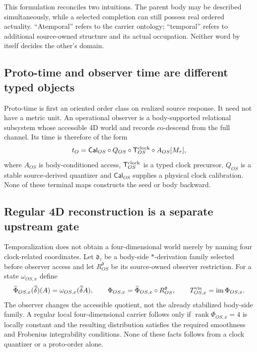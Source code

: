\documentclass[11pt]{article}
\begin{document}
This formulation reconciles two intuitions.  The parent body may be described
simultaneously, while a selected completion can still possess real ordered
actuality.  ``Atemporal'' refers to the carrier ontology; ``temporal'' refers
to additional source-owned structure and its actual occupation.  Neither word
by itself decides the other's domain.

\subsection{Proto-time and observer time are different typed objects}

Proto-time is first an oriented order class on realized source response.  It
need not have a metric unit.  An operational observer is a body-supported
relational subsystem whose accessible 4D world and records co-descend from
the full channel.  Its time is therefore of the form
\begin{equation}
 t_O
 =\mathsf{Cal}_{OS}\circ Q_{OS}\circ
 \mathsf T_{OS}^{\rm clock}\circ A_{OS}[M_\tau],
 \label{eq:observer-time}
\end{equation}
where \(A_{OS}\) is body-conditioned access, \(\mathsf T_{OS}^{\rm clock}\)
is a typed clock precursor, \(Q_{OS}\) is a stable source-derived quantizer
and \(\mathsf{Cal}_{OS}\) supplies a physical clock calibration.  None of
these terminal maps constructs the seed or body backward.

\subsection{Regular 4D reconstruction is a separate upstream gate}

Temporalization does not obtain a four-dimensional world merely by naming
four clock-related coordinates.  Let $\mathfrak d_\tau$ be a body-side
$*$-derivation family selected before observer access and let
$R^{\mathfrak d}_{OS}$ be its source-owned observer restriction.  For a
state $\omega_{OS,x}$ define
\begin{equation}
 \widetilde\Phi_{OS,x}(\widehat\delta)(A)
 =\omega_{OS,x}(\widehat\delta A),
 \qquad
 \Phi_{OS,x}
 =\widetilde\Phi_{OS,x}\circ R^{\mathfrak d}_{OS},
 \qquad
 T^{\rm vis}_{OS,x}=\operatorname{im}\Phi_{OS,x}.
 \label{eq:synthesis-visible-derivation-quotient}
\end{equation}
The observer changes the accessible quotient, not the already stabilized
body-side family.  A regular local four-dimensional carrier follows only if
$\operatorname{rank}\Phi_{OS,x}=4$ is locally constant and the resulting
distribution satisfies the required smoothness and Frobenius integrability
conditions.  None of these facts follows from a clock quantizer or a
proto-order alone.
\end{document}
